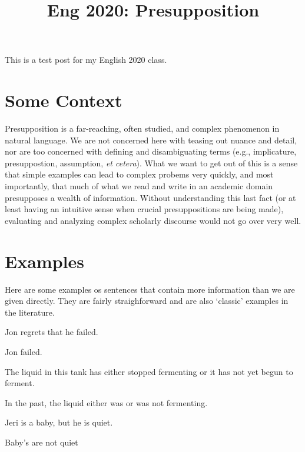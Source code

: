 \documentclass{wpblogentry}
\title{Eng 2020: Presupposition}
\begin{document}
This is a test post for my English 2020 class.
\section{Some Context}
Presupposition is a far-reaching, often studied, and complex phenomenon in natural language. We are not concerned here with teasing out nuance and detail, nor are too concerned with defining and disambiguating terms (e.g., implicature, presuppostion, assumption, \emph{et cetera}). What we want to get out of this is a sense that simple examples can lead to complex probems very quickly, and most importantly, that much of what we read and write in an academic domain presupposes a wealth of information. Without understanding this last fact (or at least having an intuitive sense when crucial presuppositions are being made), evaluating and analyzing complex scholarly discourse would not go over very well.   

\section{Examples}

Here are some examples os sentences that contain more information than we are given directly. They are fairly straighforward and are also `classic' examples in the literature. 
\begin{exe}
\ex Jon regrets that he failed.
\begin{xlist}
\ex Jon failed.
\end{xlist}

\ex The liquid in this tank has either stopped fermenting or it has not yet begun to ferment.
\begin{xlist}
\ex In the past, the liquid either was or was not fermenting.
\end{xlist}

\ex Jeri is a baby, but he is quiet.
\begin{xlist}
\ex Baby's are not quiet
\end{xlist}

\ex 
\begin{xlist}
\ex
\end{xlist}

\ex
\begin{xlist}
\ex
\end{xlist}
\end{exe}
\end{document}
